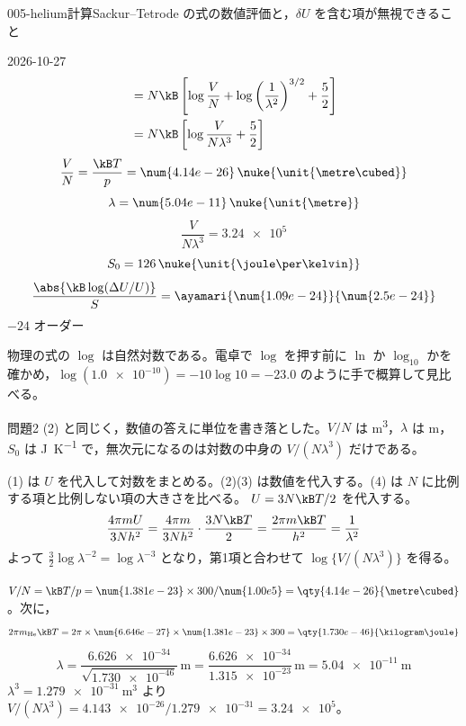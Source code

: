 \documentclass[uplatex,dvipdfmx,a4paper,11pt]{jsarticle}
\begin{document}
\begin{mondai}{005-helium}{計算}{Sackur--Tetrode の式の数値評価と，$\delta U$ を含む項が無視できること}
\begin{kotaeutsushi}{2026-10-27}
\begin{align*}
&=N\kB\left[\log\frac{V}{N}+\log\left(\frac{1}{\lambda^{2}}\right)^{3/2}+\frac{5}{2}\right]\\
&=N\kB\left[\log\frac{V}{N\lambda^{3}}+\frac{5}{2}\right]
\end{align*}
\[ \frac{V}{N}=\frac{\kB T}{p}=\num{4.14e-26}\,\nuke{\unit{\metre\cubed}} \]
\[ \lambda=\num{5.04e-11}\,\nuke{\unit{\metre}} \]
\[ \frac{V}{N\lambda^{3}}=\num{3.24e5} \]
\[ S_{0}=126\,\nuke{\unit{\joule\per\kelvin}} \]
\[ \frac{\abs{\kB\log(\Delta U/U)}}{S}=\ayamari{\num{1.09e-24}}{\num{2.5e-24}} \]
$-24$ オーダー
\end{kotaeutsushi}
\begin{kizuki}
\item 物理の式の $\log$ は自然対数である。電卓で $\log$ を押す前に $\ln$ か $\log_{10}$ かを確かめ，$\log(\num{1.0e-10})=-10\log10=-\num{23.0}$ のように手で概算して見比べる。
\item 問題2 (2) と同じく，数値の答えに単位を書き落とした。$V/N$ は \unit{\metre\cubed}，$\lambda$ は \unit{\metre}，$S_{0}$ は \unit{\joule\per\kelvin} で，無次元になるのは対数の中身の $V/(N\lambda^{3})$ だけである。
\end{kizuki}
\begin{tadashii}
\houshin (1) は $U$ を代入して対数をまとめる。(2)(3) は数値を代入する。(4) は $N$ に比例する項と比例しない項の大きさを比べる。
\keisan
{} $U=3N\kB T/2$ を代入する。
\[\frac{4\pi mU}{3Nh^{2}}=\frac{4\pi m}{3Nh^{2}}\cdot\frac{3N\kB T}{2}=\frac{2\pi m\kB T}{h^{2}}=\frac{1}{\lambda^{2}}\]
よって $\frac{3}{2}\log\lambda^{-2}=\log\lambda^{-3}$ となり，第1項と合わせて $\log\{V/(N\lambda^{3})\}$ を得る。

 $V/N=\kB T/p=\num{1.381e-23}\times300/\num{1.00e5}=\qty{4.14e-26}{\metre\cubed}$。次に，
\[2\pi m_{\mathrm{He}}\kB T=2\pi\times\num{6.646e-27}\times\num{1.381e-23}\times300=\qty{1.730e-46}{\kilogram\joule}\]
\[\lambda=\frac{\num{6.626e-34}}{\sqrt{\num{1.730e-46}}}\,\unit{\metre}=\frac{\num{6.626e-34}}{\num{1.315e-23}}\,\unit{\metre}=\qty{5.04e-11}{\metre}\]
$\lambda^{3}=\qty{1.279e-31}{\metre\cubed}$ より $V/(N\lambda^{3})=\num{4.143e-26}/\num{1.279e-31}=\num{3.24e5}$。


\end{tadashii}
\end{mondai}
\end{document}
